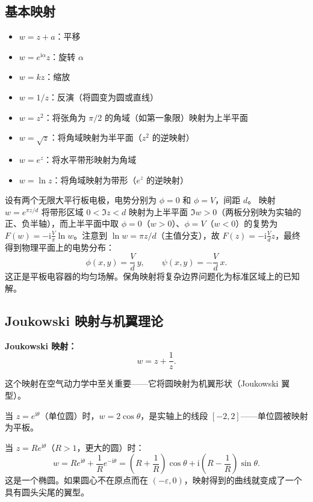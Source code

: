 \subsection{基本映射}

\begin{itemize}
\item $w = z + a$：平移
\item $w = e^{\mathrm{i}\alpha}z$：旋转 $\alpha$
\item $w = kz$：缩放
\item $w = 1/z$：反演（将圆变为圆或直线）
\item $w = z^2$：将张角为 $\pi/2$ 的角域（如第一象限）映射为上半平面
\item $w = \sqrt{z}$：将角域映射为半平面（$z^2$ 的逆映射）
\item $w = e^z$：将水平带形映射为角域
\item $w = \ln z$：将角域映射为带形（$e^z$ 的逆映射）
\end{itemize}

\begin{example}[用保角映射求解静电场]
设有两个无限大平行板电极，电势分别为 $\phi=0$ 和 $\phi=V$，间距 $d$。
映射 $w = e^{\pi z/d}$ 将带形区域 $0<\Im z<d$ 映射为上半平面 $\Im w>0$（两板分别映为实轴的正、负半轴），而上半平面中取 $\phi=0$（$w>0$）、$\phi=V$（$w<0$）的复势为 $F(w) = -\mathrm{i}\frac{V}{\pi}\ln w$。注意到 $\ln w = \pi z/d$（主值分支），故 $F(z) = -\mathrm{i}\frac{V}{d}z$，最终得到物理平面上的电势分布：
\begin{equation}
\phi(x,y) = \frac{V}{d}\,y,
\qquad
\psi(x,y) = -\frac{V}{d}\,x.
\end{equation}
这正是平板电容器的均匀场解。保角映射将复杂边界问题化为标准区域上的已知解。
\end{example}

\subsection{Joukowski 映射与机翼理论}

\textbf{Joukowski 映射：}
\begin{equation}
w = z + \frac{1}{z}.
\label{eq:joukowski}
\end{equation}

这个映射在空气动力学中至关重要——它将圆映射为机翼形状（Joukowski 翼型）。

当 $z = e^{\mathrm{i}\theta}$（单位圆）时，$w = 2\cos\theta$，是实轴上的线段 $[-2,2]$——单位圆被映射为平板。

当 $z = Re^{\mathrm{i}\theta}$（$R>1$，更大的圆）时：
\begin{equation}
w = Re^{\mathrm{i}\theta} + \frac{1}{R}e^{-\mathrm{i}\theta}
= \left(R + \frac{1}{R}\right)\cos\theta + \mathrm{i}\left(R - \frac{1}{R}\right)\sin\theta.
\end{equation}
这是一个椭圆。如果圆心不在原点而在 $(-\varepsilon,0)$，映射得到的曲线就变成了一个具有圆头尖尾的翼型。

